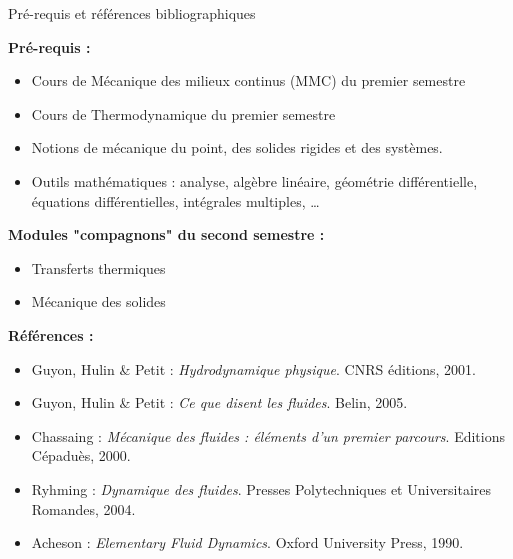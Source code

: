 \begin{frame}{Pré-requis et références bibliographiques}

\small
\textbf{Pré-requis :} \smallskip

\begin{itemize}
\item
	Cours de \textcolor{rouge}{Mécanique des milieux continus} (MMC) du premier semestre
\item
	Cours de Thermodynamique du premier semestre
\item
	Notions de mécanique du point, des solides rigides et des systèmes.
\item
	Outils mathématiques : analyse, algèbre linéaire, géométrie différentielle, 
	 équations différentielles, intégrales multiples, \ldots
\end{itemize}

\pause

\medskip
\textbf{Modules "compagnons" du second semestre :} \smallskip

\begin{itemize}
\item
	Transferts thermiques 
\item
	Mécanique des solides 
\end{itemize}

\pause

\medskip
\textbf{Références :} \smallskip

\begin{itemize}
\item[] \hspace{-5mm}
	Guyon, Hulin \& Petit : \textsl{Hydrodynamique physique}.
		CNRS éditions, 2001.
\item[] \hspace{-5mm}
	Guyon, Hulin \& Petit : 
		\textsl{Ce que disent les fluides}.	Belin, 2005. 
\item[] \hspace{-5mm}
	Chassaing : \textsl{Mécanique des fluides : éléments d'un premier parcours}.
		Editions Cépaduès, 2000.
\item[] \hspace{-5mm}
	Ryhming : \textsl{Dynamique des fluides}.
		Presses Polytechniques et Universitaires Romandes, 2004.
\item[] \hspace{-5mm}
	Acheson : \textsl{Elementary Fluid Dynamics}. 
		Oxford University Press, 1990.
\end{itemize}

\end{frame}

